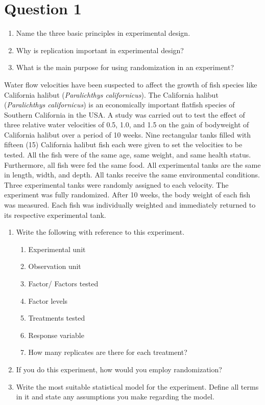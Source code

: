 \documentclass[
  a4paper]{article}
\author{}
\date{\vspace{-2.5em}}
\begin{document}
\section{Question 1}\label{question-1}

\begin{enumerate}
\def\labelenumi{\roman{enumi})}
\item
  Name the three basic principles in experimental design.
\item
  Why is replication important in experimental design?
\item
  What is the main purpose for using randomization in an experiment?
\end{enumerate}

Water flow velocities have been suspected to affect the growth of fish
species like California halibut (\emph{Paralichthys californicus}). The
California halibut (\emph{Paralichthys californicus}) is an economically
important flatfish species of Southern California in the USA. A study
was carried out to test the effect of three relative water velocities of
0.5, 1.0, and 1.5 on the gain of bodyweight of California halibut over a
period of 10 weeks. Nine rectangular tanks filled with fifteen (15)
California halibut fish each were given to set the velocities to be
tested. All the fish were of the same age, same weight, and same health
status. Furthermore, all fish were fed the same food. All experimental
tanks are the same in length, width, and depth. All tanks receive the
same environmental conditions. Three experimental tanks were randomly
assigned to each velocity. The experiment was fully randomized. After 10
weeks, the body weight of each fish was measured. Each fish was
individually weighted and immediately returned to its respective
experimental tank.~

\begin{enumerate}
\def\labelenumi{\roman{enumi})}
\setcounter{enumi}{3}
\item
  Write the following with reference to this experiment.

  \begin{enumerate}
  \def\labelenumii{(\alph{enumii})}
  \item
    Experimental unit
  \item
    Observation unit
  \item
    Factor/ Factors tested
  \item
    Factor levels
  \item
    Treatments tested
  \item
    Response variable
  \item
    How many replicates are there for each treatment?
  \end{enumerate}
\item
  If you do this experiment, how would you employ randomization?
\item
  Write the most suitable statistical model for the experiment. Define
  all terms in it and state any assumptions you make regarding the
  model.
\end{enumerate}
\end{document}
